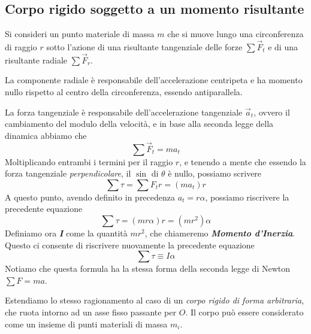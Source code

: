 \documentclass[a4paper,11pt,oneside]{book}
\begin{document}
\subsection{Corpo rigido soggetto a un momento risultante}
Si consideri un punto materiale di massa $m$ che si muove lungo una circonferenza di raggio $r$ 
sotto l’azione di una risultante tangenziale delle forze $\sum \vec{F}_t$ e di una risultante radiale $\sum \vec{F}_r$.

La componente radiale è responsabile dell'accelerazione centripeta e ha momento nullo rispetto al centro della circonferenza, essendo antiparallela. 

La forza tangenziale è responsabile dell'accelerazione tangenziale $\vec{a}_t$, ovvero il cambiamento del modulo della velocità, e in base alla seconda legge
della dinamica abbiamo che 
\begin{equation*}
    \sum \vec{F}_t = ma_t
\end{equation*}
Moltiplicando entrambi i termini per il raggio $r$, e tenendo a mente che essendo la forza tangenziale \emph{perpendicolare}, il $\sin$ di $\theta$ è nullo, possiamo scrivere
\begin{equation*}
    \sum \tau = \sum F_t r = (ma_t) r
\end{equation*}
A questo punto, avendo definito in precedenza $a_t = r\alpha$, possiamo riscrivere la precedente equazione
\begin{equation*}
    \sum \tau = (mr\alpha)r = (mr^2)\alpha
\end{equation*}
Definiamo ora \textbf{\emph{I}} come la quantità $mr^2$, che chiameremo \textbf{\emph{Momento d'Inerzia}}.
Questo ci consente di riscrivere nuovamente la precedente equazione
\begin{equation*}
    \sum \tau \equiv I\alpha
\end{equation*}
Notiamo che questa formula ha la stessa forma della seconda legge di Newton $\sum F = ma $.

Estendiamo lo stesso ragionamento al caso di un \emph{corpo rigido di forma arbitraria}, che ruota intorno ad un asse fisso passante per $O$.
Il corpo può essere considerato come un insieme di punti materiali di massa $m_i$.
\end{document}
